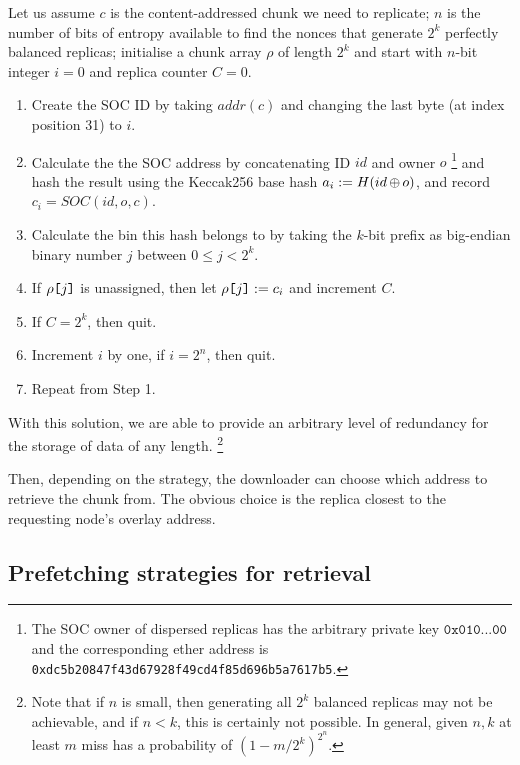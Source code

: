 Let us assume $c$ is the content-addressed chunk we need to replicate; $n$ is the number of bits of entropy available to find the nonces that generate  $2^k$  perfectly balanced replicas; initialise a chunk array $\rho$ of length $2^k$ and start with $n$-bit integer $i=0$ and replica counter $C=0$.

\begin{enumerate}[noitemsep]
  \item Create the SOC ID by taking $\mathit{addr}(c)$ and changing the last byte (at index position 31) to  $i$.
  \item Calculate the the SOC address by concatenating ID $id$ and owner $o$%
%
\footnote{The SOC owner of dispersed replicas has the arbitrary private key $\texttt{0x010...00}$
and the corresponding ether address is 
\texttt{0xdc5b20847f43d67928f49cd4f85d696b5a7617b5}.}
%
and hash the result using the Keccak256 base hash $a_i:=H(id\operatorname{\operatorname{\oplus}} o)$, and record $c_i=\mathit{SOC}(id,o,c)$.
  \item Calculate the bin this hash belongs to by taking the $k$-bit prefix as big-endian binary number $j$ between $0\leq j<2^k$.
  \item If $\rho\texttt{[}\/j\/\texttt{]}$ is unassigned, then let $\rho\texttt{[}\/j\/\texttt{]}:=c_i$ and increment $C$.
  \item If $C=2^k$, then quit.
  \item Increment $i$ by one, if $i=2^n$, then quit.
  \item Repeat from Step 1.
\end{enumerate}

With this solution, we are able to provide an arbitrary level of redundancy for the storage of data of any length.
%
%
\footnote{Note that if $n$ is small, then generating all $2^k$ balanced replicas may not be achievable, and if $n<k$, this is certainly not possible.
In general, given $n, k$ at least $m$ miss has a probability of $(1 - m/2^k)^{2^n}$.}

Then, depending on the strategy, the downloader can choose which  address to retrieve the chunk from. The obvious choice is the replica closest to the requesting node's overlay address.


\subsection{Prefetching strategies for retrieval}
\label{sec:strategies}

